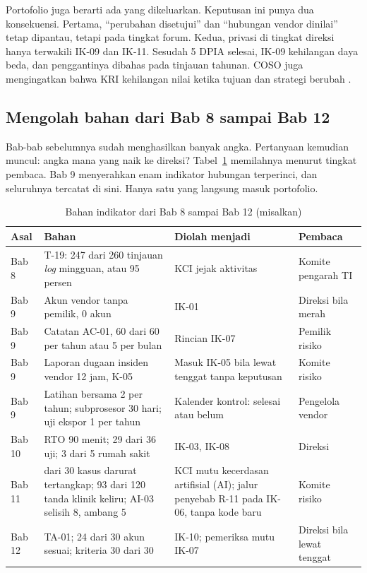 Portofolio juga berarti ada yang dikeluarkan. Keputusan ini punya dua konsekuensi. Pertama,
``perubahan disetujui'' dan ``hubungan vendor dinilai'' tetap dipantau, tetapi pada tingkat forum.
Kedua, privasi di tingkat direksi hanya terwakili IK-09 dan IK-11. Sesudah 5 DPIA selesai, IK-09
kehilangan daya beda, dan penggantinya dibahas pada tinjauan tahunan. COSO juga mengingatkan bahwa
KRI kehilangan nilai ketika tujuan dan strategi berubah \cite{c13-coso-kri}.

\subsection*{Mengolah bahan dari Bab 8 sampai Bab 12}

Bab-bab sebelumnya sudah menghasilkan banyak angka. Pertanyaan kemudian muncul: angka mana yang naik
ke direksi? Tabel~\ref{tab:ch13-bahan} memilahnya menurut tingkat pembaca. Bab 9 menyerahkan enam
indikator hubungan terperinci, dan seluruhnya tercatat di sini. Hanya satu yang langsung masuk
portofolio.

\begin{table}[!htb]
  \centering\small
  \caption{Bahan indikator dari Bab 8 sampai Bab 12 (misalkan)}\label{tab:ch13-bahan}
  \begin{tabularx}{\textwidth}{|>{\raggedright\arraybackslash}p{}|>{\raggedright\arraybackslash}X|>{\raggedright\arraybackslash}p{}|>{\raggedright\arraybackslash}p{}|}
    \hline
    \textbf{Asal} & \textbf{Bahan} & \textbf{Diolah menjadi} & \textbf{Pembaca} \\ \hline
    Bab 8 & T-19: 247 dari 260 tinjauan \textit{log} mingguan, atau 95 persen & KCI jejak aktivitas
    & Komite pengarah TI \\ \hline
    Bab 9 & Akun vendor tanpa pemilik, 0 akun & IK-01 & Direksi bila merah \\ \hline
    Bab 9 & Catatan AC-01, 60 dari 60 per tahun atau 5 per bulan & Rincian IK-07 & Pemilik risiko \\
    \hline
    Bab 9 & Laporan dugaan insiden vendor 12 jam, K-05 & Masuk IK-05 bila lewat tenggat tanpa
    keputusan & Komite risiko \\ \hline
    Bab 9 & Latihan bersama 2 per tahun; subprosesor 30 hari; uji ekspor 1 per tahun & Kalender
    kontrol: selesai atau belum & Pengelola vendor \\ \hline
    Bab 10 & RTO 90 menit; 29 dari 36 uji; 3 dari 5 rumah sakit & IK-03, IK-08 & Direksi \\ \hline
    Bab 11 & 27 dari 30 kasus darurat tertangkap; 93 dari 120 tanda klinik keliru; AI-03 selisih 8,
    ambang 5 & KCI mutu kecerdasan artifisial (AI); jalur penyebab R-11 pada IK-06, tanpa kode baru
    & Komite risiko \\ \hline
    Bab 12 & TA-01; 24 dari 30 akun sesuai; kriteria 30 dari 30 & IK-10; pemeriksa mutu IK-07 &
    Direksi bila lewat tenggat \\ \hline
  \end{tabularx}
\end{table}

